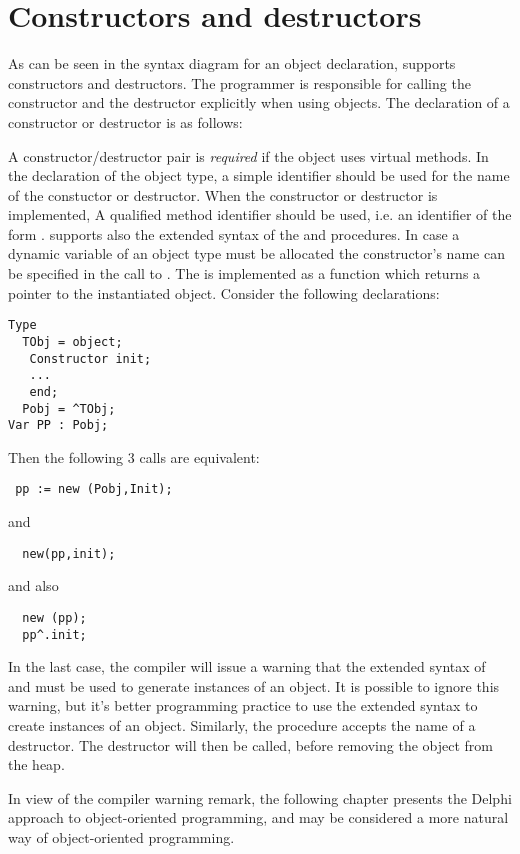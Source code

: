 \section{Constructors and destructors }
\label{se:constructdestruct}
As can be seen in the syntax diagram for an object declaration, \fpc supports
constructors and destructors. The programmer is responsible for calling the
constructor and the destructor explicitly when using objects.
The declaration of a constructor or destructor is as follows:

A constructor/destructor pair is {\em required} if the object uses virtual methods.
In the declaration of the object type, a simple identifier should be used
for the name of the constuctor or destructor. When the constructor or destructor
is implemented, A qualified method identifier should be used,
i.e. an identifier of the form .
\fpc supports also the extended syntax of the  and 
procedures. In case a dynamic variable of an object type must be allocated
the constructor's name can be specified in the call to .
The  is implemented as a function which returns a pointer to the
instantiated object. Consider the following declarations:
\begin{verbatim}
Type
  TObj = object;
   Constructor init;
   ...
   end;
  Pobj = ^TObj;
Var PP : Pobj;
\end{verbatim}
Then the following 3 calls are equivalent:
\begin{verbatim}
 pp := new (Pobj,Init);
\end{verbatim}
and
\begin{verbatim}
  new(pp,init);
\end{verbatim}
and also
\begin{verbatim}
  new (pp);
  pp^.init;
\end{verbatim}
In the last case, the compiler will issue a warning that the
extended syntax of  and  must be used to generate instances of an
object. It is possible to ignore this warning, but it's better programming practice to
use the extended syntax to create instances of an object.
Similarly, the  procedure accepts the name of a destructor. The
destructor will then be called, before removing the object from the heap.

In view of the compiler warning remark, the following chapter presents the
Delphi approach to object-oriented programming, and may be considered a
more natural way of object-oriented programming.

